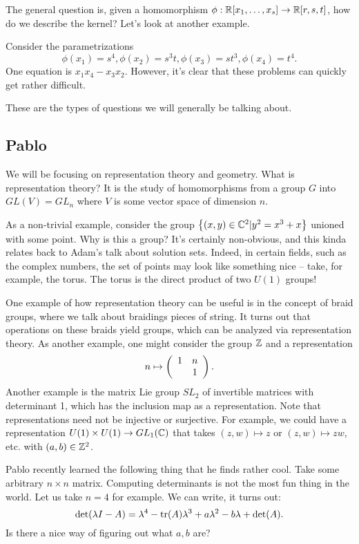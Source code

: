 \documentclass{../mathnotes}
\begin{document}
The general question is, given a homomorphism $\phi:\mathbb{R}[x_1,\ldots,x_s]\to\mathbb{R}[r,s,t]$, how do we describe the kernel?
Let's look at another example.

\begin{exmp}
    Consider the parametrizations
    \[\phi(x_1)=s^4,\phi(x_2)=s^3t,\phi(x_3)=st^3,\phi(x_4)=t^4.\]
    One equation is $x_1x_4-x_3x_2$. However, it's clear that these problems can quickly get rather difficult.
\end{exmp}

These are the types of questions we will generally be talking about.

\subsection{Pablo}

We will be focusing on representation theory and geometry. What is representation theory? It is the study of
homomorphisms from a group $G$ into $GL(V)=GL_n$ where $V$ is some vector space of dimension $n$.

As a non-trivial example, consider the group $\left\{ (x,y)\in\mathbb{C}^2|y^2=x^3+x \right\}$ unioned with some point.
Why is this a group? It's certainly non-obvious, and this kinda relates back to Adam's talk about solution sets.
Indeed, in certain fields, such as the complex numbers, the set of points may look like something nice -- take, for
example, the torus. The torus is the direct product of two $U(1)$ groups!

One example of how representation theory can be useful is in the concept of braid groups, where we talk about
braidings pieces of string. It turns out that operations on these braids yield groups, which can be analyzed via
representation theory. As another example, one might consider the group $\mathbb{Z}$ and a representation
\[n\mapsto
    \left(
    \begin{array}[]{cc}
        1 & n\\
          & 1
    \end{array}
    \right).
    \]
Another example  is the matrix Lie group $SL_2$ of invertible matrices with determinant 1, which has the inclusion
map as a representation. Note that representations need not be injective or surjective. For example, we could have a representation
$U(1)\times U(1)\to GL_1(\mathbb{C})$ that takes $(z,w)\mapsto z$ or $(z,w)\mapsto zw$, etc. with $(a,b)\in\mathbb{Z}^2$.

Pablo recently learned the following thing that he finds rather cool. Take some arbitrary $n\times n$ matrix. Computing determinants
is not the most fun thing in the world. Let us take $n=4$ for example. We can write, it turns out:
\[\det(\lambda I-A)=\lambda^4-\operatorname{tr}(A)\lambda^3+a\lambda^2-b\lambda+\det(A).\]
Is there a nice way of figuring out what $a,b$ are?
\end{document}
